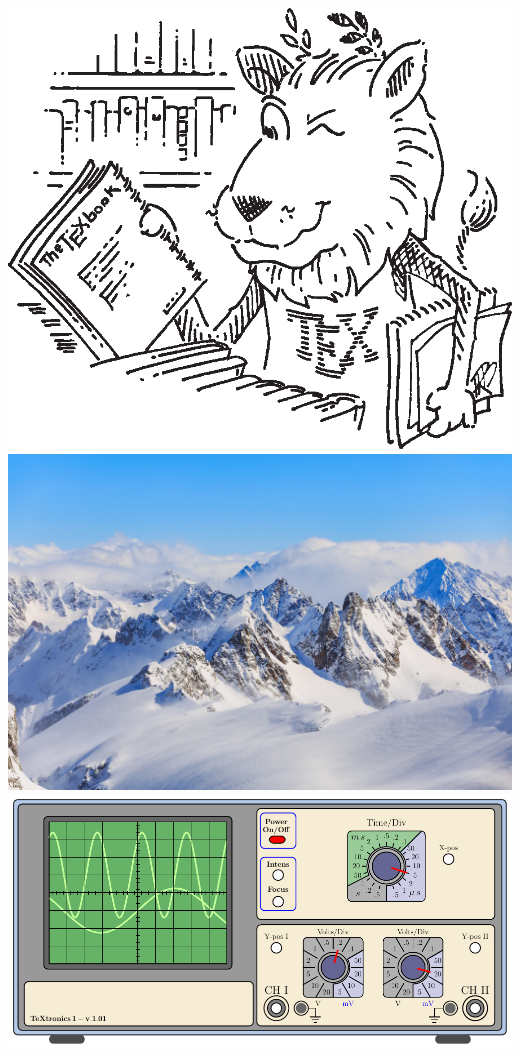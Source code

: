 \documentclass{ctexart}
\begin{document}
    \includegraphics[scale=0.3]{lion}
    \includegraphics[scale=0.03]{mountain}
    \includegraphics[scale=0.3]{oscilloscope}
    
\end{document}
